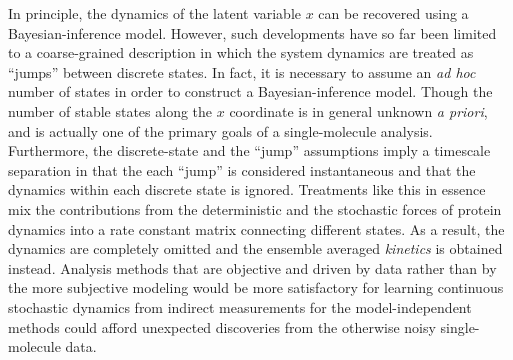 \documentclass[journal=jpcbfk,manuscript=article,layout=twocolumn,articletitle=true]{achemso}
\begin{document}
In principle, the dynamics of the latent variable $x$ can be recovered using a Bayesian-inference model. However, such developments have so far been limited to a coarse-grained description in which the system dynamics are treated as ``jumps'' between discrete states.\cite{Talaga_JPCA_2003,Kou:2005vu,Zucchini:2009tn,Bronson:2009im,Gopich:2009di,Bronson:2010bv,Liu:2010bz} In fact, it is necessary to assume an {\it ad hoc} number of states in order to construct a Bayesian-inference model. Though the number of stable states along the $x$ coordinate is in general unknown {\it a priori}, and is actually one of the primary goals of a single-molecule analysis. Furthermore, the discrete-state and the ``jump'' assumptions imply a timescale separation in that the each ``jump'' is considered instantaneous and that the dynamics within each discrete state is ignored. Treatments like this in essence mix the contributions from the deterministic and the stochastic forces of protein dynamics into a rate constant matrix connecting different states. As a result, the dynamics are completely omitted and the ensemble averaged {\em kinetics} is obtained instead. Analysis methods that are objective and driven by data rather than by the more subjective modeling would be more satisfactory for learning continuous stochastic dynamics from indirect measurements for the model-independent methods could afford unexpected discoveries from the otherwise noisy single-molecule data.
\end{document}
